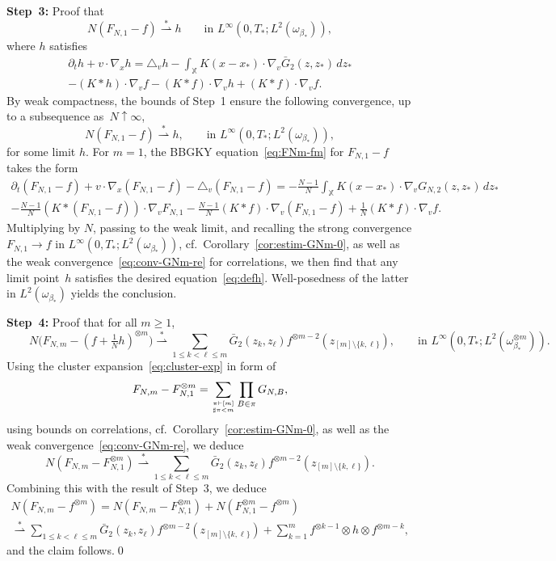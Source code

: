\documentclass[a4paper,11pt,reqno,noindent]{amsart}
\theoremstyle{plain}
\theoremstyle{definition}
\numberwithin{equation}{section}
\newcommand{\Xd}{\mathbb X}
\begin{document}
\medskip\noindent
{\bf Step~3:} Proof that
\[N(F_{N,1}-f)\overset*\rightharpoonup h\qquad\text{in $L^\infty(0,T_*;L^2(\omega_{\beta_*}))$},\]
where $h$ satisfies
\begin{multline}\label{eq:defh}
\partial_th+v\cdot\nabla_{x}h
=\triangle_{v}h
-\int_\Xd K(x-x_*)\cdot\nabla_{v}\bar G_{2}(z,z_*)\,dz_*\\
- (K\ast h)\cdot\nabla_{v}f
- (K\ast f)\cdot\nabla_{v}h
+(K\ast f)\cdot\nabla_{v}f.
\end{multline}
By weak compactness, the bounds of Step~1 ensure the following convergence, up to a subsequence as~$N\uparrow\infty$,
\[N(F_{N,1}-f)\overset*\rightharpoonup h,\qquad\text{in $L^\infty(0,T_*;L^2(\omega_{\beta_*}))$},\]
for some limit $h$.
For $m=1$, the BBGKY equation~\eqref{eq:FNm-fm} for $F_{N,1}-f$ takes the form
\begin{multline*}
\partial_t(F_{N,1}-f)+v\cdot\nabla_{x}(F_{N,1}-f)
-\triangle_{v}(F_{N,1}-f)
=-\frac{N-1}N\int_\Xd K(x-x_*)\cdot\nabla_{v}G_{N,2}(z,z_*)\,dz_*\\
-\frac{N-1}N (K\ast(F_{N,1}-f))\cdot\nabla_{v}F_{N,1}
-\frac{N-1}N (K\ast f)\cdot\nabla_{v}(F_{N,1}-f)
+\frac1N (K\ast f)\cdot\nabla_{v}f.
\end{multline*}
Multiplying by $N$, passing to the weak limit, and recalling the strong convergence $F_{N,1}\to f$ in $L^\infty(0,T_*;L^2(\omega_{\beta_*}))$, cf.~Corollary~\ref{cor:estim-GNm-0}, as well as the weak convergence~\eqref{eq:conv-GNm-re} for correlations, we then find that any limit point~$h$ satisfies the desired equation~\eqref{eq:defh}. Well-posedness of the latter in $L^2(\omega_{\beta_*})$ yields the conclusion.

\medskip\noindent
{\bf Step~4:} Proof that for all $m\ge1$,
\[\qquad N\Big(F_{N,m}-(f+\tfrac1Nh)^{\otimes m}\Big)
\overset*\rightharpoonup\sum_{1\le k<\ell\le m}\bar G_2(z_k,z_\ell)f^{\otimes m-2}(z_{[m]\setminus\{k,\ell\}}),\qquad\text{in $L^\infty(0,T_*;L^2(\omega_{\beta_*}^{\otimes m}))$.}\]
Using the cluster expansion~\eqref{eq:cluster-exp} in form of
\[F_{N,m}-F_{N,1}^{\otimes m}=\sum_{\pi\vdash[m]\atop\sharp\pi<m}\prod_{B\in\pi}G_{N,B},\]
using bounds on correlations, cf.~Corollary~\ref{cor:estim-GNm-0}, as well as the weak convergence~\eqref{eq:conv-GNm-re}, we deduce
\[N(F_{N,m}-F_{N,1}^{\otimes m})\overset*\rightharpoonup\sum_{1\le k<\ell\le m}\bar G_{2}(z_k,z_\ell)f^{\otimes m-2}(z_{[m]\setminus\{k,\ell\}}).\]
Combining this with the result of Step~3, we deduce
\begin{multline*}
N(F_{N,m}-f^{\otimes m})
=N(F_{N,m}-F_{N,1}^{\otimes m})+N(F_{N,1}^{\otimes m}-f^{\otimes m})\\
\overset*\rightharpoonup
\sum_{1\le k<\ell\le m}\bar G_{2}(z_k,z_\ell)f^{\otimes m-2}(z_{[m]\setminus\{k,\ell\}})
+\sum_{k=1}^mf^{\otimes k-1}\otimes h\otimes f^{\otimes m-k},
\end{multline*}
and the claim follows.\qed
\end{document}
